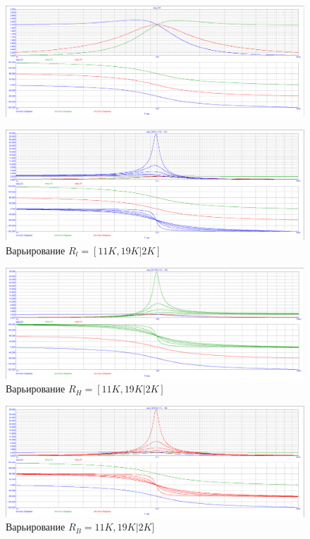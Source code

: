 \documentclass[15pt,a5paper,reqno]{article}
\begin{document}
\begin{figure}[h!]
    \centering
    \includegraphics[width=12cm]{pics/point4.png}
    \caption{}
    \label{Задание 4 пункт 1. частотные характеристики фнч фвч и пф}
\end{figure}



\begin{figure}[h!]
    \centering
    \includegraphics[width=12cm]{pics/point4_1_var1.png}
    \caption{Варьирование $R_l = [11K, 19K | 2K]$}
    \label{}
\end{figure}



\begin{figure}[h!]
    \centering
    \includegraphics[width=12cm]{pics/point4_1_var2.png}
    \caption{Варьирование $R_H = [11K, 19K | 2K]$}
    \label{}
\end{figure}




\begin{figure}[h!]
    \centering
    \includegraphics[width=12cm]{pics/point4_1_var3.png}
    \caption{Варьирование $R_B  = 11K, 19K | 2K]$}
    \label{}
\end{figure}
\end{document}
